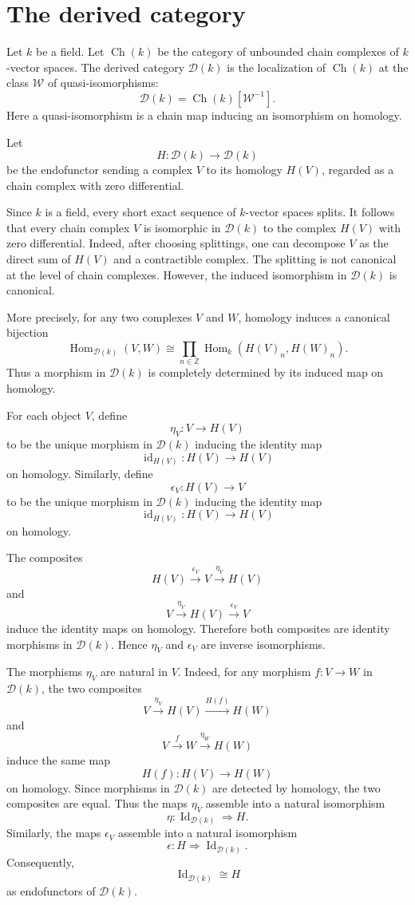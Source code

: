 \section{The derived category}\label{derived}
Let \(k\) be a field.
Let \(\operatorname{Ch}(k)\) be the category of unbounded chain complexes of \(k\)-vector spaces.
The derived category \(\mathcal D(k)\) is the localization of \(\operatorname{Ch}(k)\) at the class \(\mathcal W\) of quasi-isomorphisms:
\[
\mathcal D(k) = \operatorname{Ch}(k)[\mathcal W^{-1}].
\]
Here a quasi-isomorphism is a chain map inducing an isomorphism on homology.

Let
\[
H \colon \mathcal D(k) \to \mathcal D(k)
\]
be the endofunctor sending a complex \(V\) to its homology \(H(V)\), regarded as a chain complex with zero differential.

Since \(k\) is a field, every short exact sequence of \(k\)-vector spaces splits.
It follows that every chain complex \(V\) is isomorphic in \(\mathcal D(k)\) to the complex \(H(V)\) with zero differential.
Indeed, after choosing splittings, one can decompose \(V\) as the direct sum of \(H(V)\) and a contractible complex.
The splitting is not canonical at the level of chain complexes.
However, the induced isomorphism in \(\mathcal D(k)\) is canonical.

More precisely, for any two complexes \(V\) and \(W\), homology induces a canonical bijection
\[
\operatorname{Hom}_{\mathcal D(k)}(V,W) \cong \prod_{n \in \mathbb Z} \operatorname{Hom}_k(H(V)_n,H(W)_n).
\]
Thus a morphism in \(\mathcal D(k)\) is completely determined by its induced map on homology.

For each object \(V\), define
\[
\eta_V \colon V \to H(V)
\]
to be the unique morphism in \(\mathcal D(k)\) inducing the identity map
\[
\operatorname{id}_{H(V)} \colon H(V) \to H(V)
\]
on homology.
Similarly, define
\[
\epsilon_V \colon H(V) \to V
\]
to be the unique morphism in \(\mathcal D(k)\) inducing the identity map
\[
\operatorname{id}_{H(V)} \colon H(V) \to H(V)
\]
on homology.

The composites
\[
H(V) \xrightarrow{\epsilon_V} V \xrightarrow{\eta_V} H(V)
\]
and
\[
V \xrightarrow{\eta_V} H(V) \xrightarrow{\epsilon_V} V
\]
induce the identity maps on homology.
Therefore both composites are identity morphisms in \(\mathcal D(k)\).
Hence \(\eta_V\) and \(\epsilon_V\) are inverse isomorphisms.

The morphisms \(\eta_V\) are natural in \(V\).
Indeed, for any morphism \(f \colon V \to W\) in \(\mathcal D(k)\), the two composites
\[
V \xrightarrow{\eta_V} H(V) \xrightarrow{H(f)} H(W)
\]
and
\[
V \xrightarrow{f} W \xrightarrow{\eta_W} H(W)
\]
induce the same map
\[
H(f) \colon H(V) \to H(W)
\]
on homology.
Since morphisms in \(\mathcal D(k)\) are detected by homology, the two composites are equal.
Thus the maps \(\eta_V\) assemble into a natural isomorphism
\[
\eta \colon \operatorname{Id}_{\mathcal D(k)} \Rightarrow H.
\]
Similarly, the maps \(\epsilon_V\) assemble into a natural isomorphism
\[
\epsilon \colon H \Rightarrow \operatorname{Id}_{\mathcal D(k)}.
\]
Consequently,
\[
\operatorname{Id}_{\mathcal D(k)} \cong H
\]
as endofunctors of \(\mathcal D(k)\).

